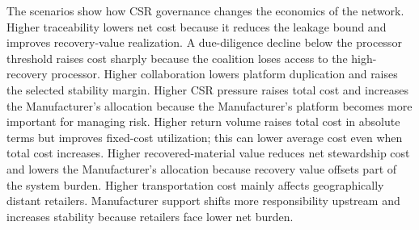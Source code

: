 \begin{table}[htbp]
\centering
\caption{Sensitivity of Grand-Coalition Cost, Manufacturer Allocation, and Stability}
\label{tab:sensitivity}
\end{table}

The scenarios show how CSR governance changes the economics of the network. Higher traceability lowers net cost because it reduces the leakage bound and improves recovery-value realization. A due-diligence decline below the processor threshold raises cost sharply because the coalition loses access to the high-recovery processor. Higher collaboration lowers platform duplication and raises the selected stability margin. Higher CSR pressure raises total cost and increases the Manufacturer's allocation because the Manufacturer's platform becomes more important for managing risk. Higher return volume raises total cost in absolute terms but improves fixed-cost utilization; this can lower average cost even when total cost increases. Higher recovered-material value reduces net stewardship cost and lowers the Manufacturer's allocation because recovery value offsets part of the system burden. Higher transportation cost mainly affects geographically distant retailers. Manufacturer support shifts more responsibility upstream and increases stability because retailers face lower net burden.

